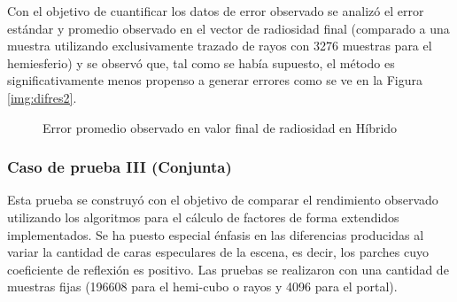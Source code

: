 Con el objetivo de cuantificar los datos de error observado se analizó el error estándar y promedio observado en el vector de radiosidad final (comparado a una muestra utilizando exclusivamente trazado de rayos con 3276 muestras para el hemiesferio) y se observó que, tal como se había supuesto, el método es significativamente menos propenso a generar errores como se ve en la Figura \ref{img:difres2}.

\begin{figure}
\caption{Error promedio observado en valor final de radiosidad en Híbrido}
\label{plot:errorcII}
\end{figure}
\subsubsection{Caso de prueba III (Conjunta)}

Esta prueba se construyó con el objetivo de comparar el rendimiento observado utilizando los algoritmos para el cálculo de factores de forma extendidos implementados. Se ha puesto especial énfasis en las diferencias producidas al variar la cantidad de caras especulares de la escena, es decir, los parches cuyo coeficiente de reflexión es positivo. Las pruebas se realizaron con una cantidad de muestras fijas (196608 para el hemi-cubo o rayos y 4096 para el portal).

